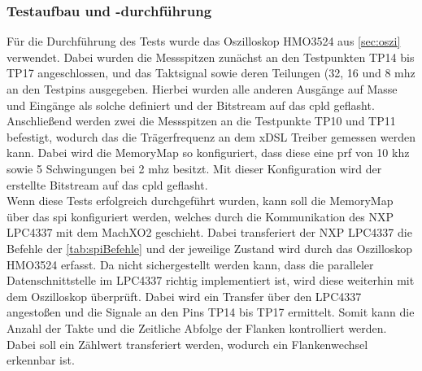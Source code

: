 \subsubsection*{Testaufbau und -durchführung}
Für die Durchführung des Tests wurde das Oszilloskop HMO3524 aus \autoref{sec:oszi} verwendet. Dabei wurden die Messspitzen zunächst an den Testpunkten TP14 bis TP17 angeschlossen, und das Taktsignal sowie deren Teilungen (32, 16 und 8 \ac{mhz} an den Testpins ausgegeben. Hierbei wurden alle anderen Ausgänge auf Masse und Eingänge als solche definiert und der Bitstream auf das \ac{cpld} geflasht. Anschließend werden zwei die Messspitzen an die Testpunkte TP10 und TP11 befestigt, wodurch das die Trägerfrequenz an dem xDSL Treiber gemessen werden kann. Dabei wird die MemoryMap so konfiguriert, dass diese eine \ac{prf} von 10 \ac{khz} sowie 5 Schwingungen bei 2 \ac{mhz} besitzt. Mit dieser Konfiguration wird der erstellte Bitstream auf das \ac{cpld} geflasht.\\
Wenn diese Tests erfolgreich durchgeführt wurden, kann soll die MemoryMap über das \ac{spi} konfiguriert werden, welches durch die Kommunikation des NXP LPC4337 mit dem MachXO2 geschieht. Dabei transferiert der NXP LPC4337 die Befehle der \autoref{tab:spiBefehle} und der jeweilige Zustand wird durch das Oszilloskop HMO3524 erfasst. Da nicht sichergestellt werden kann, dass die paralleler Datenschnittstelle im LPC4337 richtig implementiert ist, wird diese weiterhin mit dem Oszilloskop überprüft. Dabei wird ein Transfer über den LPC4337 angestoßen und die Signale an den Pins TP14 bis TP17 ermittelt. Somit kann die Anzahl der Takte und die Zeitliche Abfolge der Flanken kontrolliert werden. Dabei soll ein Zählwert transferiert werden, wodurch ein Flankenwechsel erkennbar ist.
